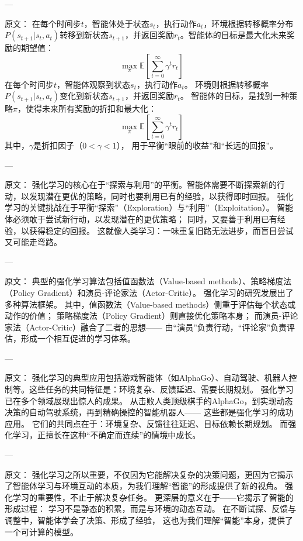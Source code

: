 ---

原文：
在每个时间步$t$，智能体处于状态$s_t$，执行动作$a_t$，环境根据转移概率分布$P(s_{t+1}|s_t, a_t)$转移到新状态$s_{t+1}$，并返回奖励$r_t$。智能体的目标是最大化未来奖励的期望值：
$$
\max_\pi \mathbb{E}\left[\sum_{t=0}^\infty \gamma^t r_t\right]
$$
在每个时间步$t$，智能体观察到状态$s_t$，执行动作$a_t$。  
环境则根据转移概率$P(s_{t+1}|s_t, a_t)$变化到新状态$s_{t+1}$，并返回奖励$r_t$。  
智能体的目标，是找到一种策略$\pi$，使得未来所有奖励的折扣和最大化：
$$
\max_\pi \mathbb{E}\left[\sum_{t=0}^\infty \gamma^t r_t\right]
$$  
其中，$\gamma$是折扣因子（$0 < \gamma < 1$），  
用于平衡“眼前的收益”和“长远的回报”。

---

原文：
强化学习的核心在于“探索与利用”的平衡。智能体需要不断探索新的行动，以发现潜在更优的策略，同时也要利用已有的经验，以获得即时回报。
强化学习的关键挑战在于平衡“探索”（Exploration）与“利用”（Exploitation）。  
智能体必须敢于尝试新行动，以发现潜在的更优策略；  
同时，又要善于利用已有经验，以获得稳定的回报。  
这就像人类学习：一味重复旧路无法进步，而盲目尝试又可能走弯路。

---

原文：
典型的强化学习算法包括值函数法（Value-based methods）、策略梯度法（Policy Gradient）和演员-评论家法（Actor-Critic）。
强化学习的研究发展出了多种算法框架。  
其中，值函数法（Value-based methods）侧重于评估每个状态或动作的价值；  
策略梯度法（Policy Gradient）则直接优化策略本身；  
而演员-评论家法（Actor-Critic）融合了二者的思想——  
由“演员”负责行动，“评论家”负责评估，形成一个相互促进的学习体系。

---

原文：
强化学习的典型应用包括游戏智能体（如AlphaGo）、自动驾驶、机器人控制等。这些任务的共同特征是：环境复杂、反馈延迟、需要长期规划。
强化学习已在多个领域展现出惊人的成果。  
从击败人类顶级棋手的AlphaGo，到实现动态决策的自动驾驶系统，再到精确操控的智能机器人——  
这些都是强化学习的成功应用。  
它们的共同点在于：环境复杂、反馈往往延迟、目标依赖长期规划。  
而强化学习，正擅长在这种“不确定而连续”的情境中成长。

---

原文：
强化学习之所以重要，不仅因为它能解决复杂的决策问题，更因为它揭示了智能体学习与环境互动的本质，为我们理解“智能”的形成提供了新的视角。
强化学习的重要性，不止于解决复杂任务。  
更深层的意义在于——它揭示了智能的形成过程：  
学习不是静态的积累，而是与环境的动态互动。  
在不断试探、反馈与调整中，智能体学会了决策、形成了经验，  
这也为我们理解“智能”本身，提供了一个可计算的模型。

